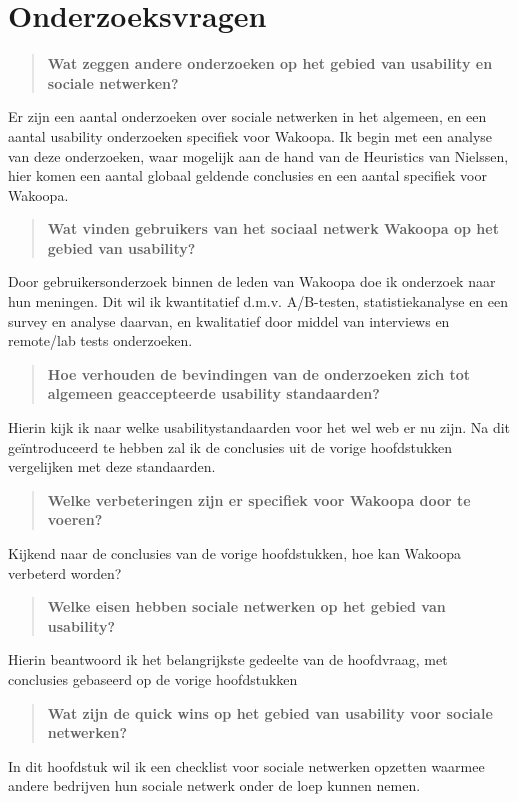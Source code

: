 \documentclass[a4paper, 10pt, pdftex]{article}
\begin{document}
\section{Onderzoeksvragen}
\begin{quote}
 \textbf{Wat zeggen andere onderzoeken op het gebied van usability en sociale netwerken?}
\end{quote}
Er zijn een aantal onderzoeken over sociale netwerken in het algemeen, en een aantal usability onderzoeken specifiek voor Wakoopa. Ik begin met een analyse van deze onderzoeken, waar mogelijk aan de hand van de Heuristics van Nielssen, hier komen een aantal globaal geldende conclusies en een aantal specifiek voor Wakoopa.

\begin{quote}
\textbf{Wat vinden gebruikers van het sociaal netwerk Wakoopa op het gebied van usability?}
\end{quote}
Door gebruikersonderzoek binnen de leden van Wakoopa doe ik onderzoek naar hun meningen. Dit wil ik kwantitatief d.m.v. A/B-testen, statistiekanalyse en een survey en analyse daarvan, en kwalitatief door middel van interviews en remote/lab tests onderzoeken.


\begin{quote}
\textbf{Hoe verhouden de bevindingen van de onderzoeken zich tot algemeen geaccepteerde usability standaarden?}
\end{quote}
Hierin kijk ik naar welke usabilitystandaarden voor het wel web er nu zijn. Na dit ge\"{i}ntroduceerd te hebben zal ik de conclusies uit de vorige hoofdstukken vergelijken met deze standaarden.


\begin{quote}
\textbf{Welke verbeteringen zijn er specifiek voor Wakoopa door te voeren?}
\end{quote}
Kijkend naar de conclusies van de vorige hoofdstukken, hoe kan Wakoopa verbeterd worden?


\begin{quote}
\textbf{Welke eisen hebben sociale netwerken op het gebied van usability?}
\end{quote}
Hierin beantwoord ik het belangrijkste gedeelte van de hoofdvraag, met conclusies gebaseerd op de vorige hoofdstukken


\begin{quote}
\textbf{Wat zijn de quick wins op het gebied van usability voor sociale netwerken?}
\end{quote}
In dit hoofdstuk wil ik een checklist voor sociale netwerken opzetten waarmee andere bedrijven hun sociale netwerk onder de loep kunnen nemen.
\end{document}
